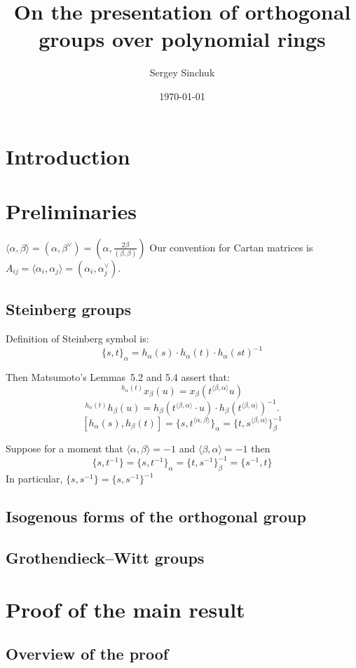 \documentclass[oneside, 10pt]{amsart}
\title{On the presentation of orthogonal groups over polynomial rings}
\author {Sergey Sinchuk}
\date {\today}
\theoremstyle{remark} %
\theoremstyle{definition}
\begin{document}
\maketitle
\section{Introduction}
\section{Preliminaries}
$\langle \alpha, \beta \rangle = (\alpha, \beta^\vee) = (\alpha, \frac{2\beta}{(\beta, \beta)})$
Our convention for Cartan matrices is 
$A_{ij} = \langle \alpha_i, \alpha_j \rangle = (\alpha_i, \alpha_j^\vee)$.

\subsection{Steinberg groups}
Definition of Steinberg symbol is:
\[ \{ s, t \}_\alpha = h_\alpha(s) \cdot h_\alpha(t) \cdot h_\alpha(st)^{-1} \]

Then Matsumoto's Lemmas~5.2 and 5.4 assert that:
\[ {}^{h_\alpha(t)}\!x_\beta(u) = x_\beta(t^{\langle \beta,  \alpha \rangle}u)\]
\[ {}^{h_\alpha(t)}\!h_\beta(u) = h_\beta(t^{\langle \beta, \alpha \rangle} \cdot u) \cdot h_\beta(t^{\langle \beta,  \alpha \rangle})^{-1}. \]
\[[h_\alpha(s), h_\beta(t)] = \{s, t^{\langle \alpha, \beta \rangle}\}_\alpha = \{t, s^{\langle \beta, \alpha \rangle}\}_\beta^{-1}\]

Suppose for a moment that $\langle \alpha, \beta \rangle = -1$ and  $\langle \beta, \alpha \rangle = -1$ then
\[ \{s, t^{-1} \} = \{s,  t^{-1}\}_\alpha = \{t, s^{-1} \}_\beta^{-1} = \{s^{-1}, t\} \]
In particular, $\{s, s^{-1}\} = \{s, s^{-1}\}^{-1}$

\subsection{Isogenous forms of the orthogonal group}
\subsection{Grothendieck--Witt groups}
\section{Proof of the main result}
\subsection{Overview of the proof}
\end{document}
